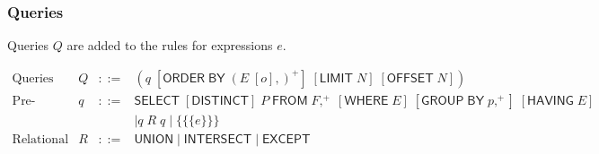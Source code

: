 \documentclass{article}
\newcommand{\mt}[1]{\mathsf{#1}}
\begin{document}
\subsubsection{Queries}

Queries $Q$ are added to the rules for expressions $e$.

$$\begin{array}{rrcll}
  \textrm{Queries} & Q &::=& (q \; [\mt{ORDER} \; \mt{BY} \; (E \; [o],)^+] \; [\mt{LIMIT} \; N] \; [\mt{OFFSET} \; N]) \\
  \textrm{Pre-queries} & q &::=& \mt{SELECT} \; [\mt{DISTINCT}] \; P \; \mt{FROM} \; F,^+ \; [\mt{WHERE} \; E] \; [\mt{GROUP} \; \mt{BY} \; p,^+] \; [\mt{HAVING} \; E] \\
  &&& \mid q \; R \; q \mid \{\{\{e\}\}\} \\
  \textrm{Relational operators} & R &::=& \mt{UNION} \mid \mt{INTERSECT} \mid \mt{EXCEPT}
\end{array}$$
\end{document}
